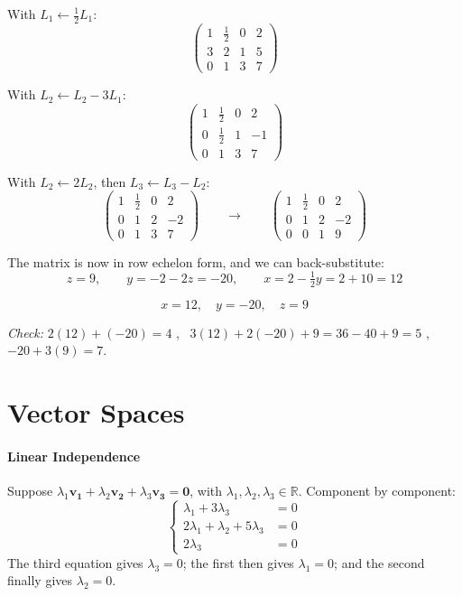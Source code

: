 \documentclass[]{article}
\newcommand{\R}{\mathbb{R}}
\begin{document}
	With $L_1 \leftarrow \frac{1}{2} L_1$:
	$$\left(\begin{array}{ccc|c}
		1 & \frac{1}{2} & 0 & 2\\
		3 & 2 & 1 & 5\\
		0 & 1 & 3 & 7
	\end{array}\right)$$

	With $L_2 \leftarrow L_2 - 3 L_1$:
	$$\left(\begin{array}{ccc|c}
		1 & \frac{1}{2} & 0 & 2\\
		0 & \frac{1}{2} & 1 & -1\\
		0 & 1 & 3 & 7
	\end{array}\right)$$

	With $L_2 \leftarrow 2 L_2$, then $L_3 \leftarrow L_3 - L_2$:
	$$\left(\begin{array}{ccc|c}
		1 & \frac{1}{2} & 0 & 2\\
		0 & 1 & 2 & -2\\
		0 & 1 & 3 & 7
	\end{array}\right)
	\qquad \longrightarrow \qquad
	\left(\begin{array}{ccc|c}
		1 & \frac{1}{2} & 0 & 2\\
		0 & 1 & 2 & -2\\
		0 & 0 & 1 & 9
	\end{array}\right)$$

	The matrix is now in row echelon form, and we can back-substitute:
	$$z = 9, \qquad y = -2 - 2z = -20, \qquad x = 2 - \tfrac{1}{2} y = 2 + 10 = 12$$

	$$\boxed{x = 12, \quad y = -20, \quad z = 9}$$

	\textit{Check:} $2(12) + (-20) = 4$ \checkmark, \ $3(12) + 2(-20) + 9 = 36 - 40 + 9 = 5$ \checkmark, \ $-20 + 3(9) = 7$. \checkmark


	\section{Vector Spaces}
	\paragraph{Linear Independence}\mbox{}

	Suppose $\lambda_1 \mathbf{v_1} + \lambda_2 \mathbf{v_2} + \lambda_3 \mathbf{v_3} = \mathbf{0}$, with $\lambda_1, \lambda_2, \lambda_3 \in \R$. Component by component:
	$$\begin{cases}
		\lambda_1 + 3\lambda_3 &= 0 \\
		2\lambda_1 + \lambda_2 + 5\lambda_3 &= 0 \\
		2\lambda_3 &= 0
	\end{cases}$$
	The third equation gives $\lambda_3 = 0$; the first then gives $\lambda_1 = 0$; and the second finally gives $\lambda_2 = 0$.
\end{document}
